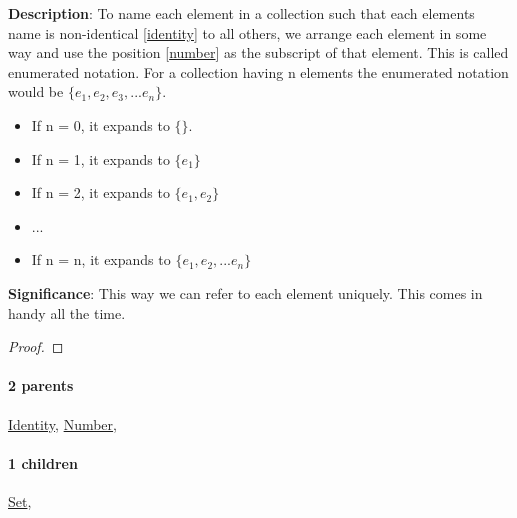 \documentclass[../main.tex]{subfiles}
\begin{document}
\begin{statement}
\label{statement:Enumerated Notation}\hspace*{0pt}\par
\end{statement}
\textbf{Description}:
To name each element in a collection such that each elements name is non-identical [\hyperref[statement:Identity]{identity}] to all others, we arrange each element in some way and use the position [\hyperref[statement:Number]{number}] as the subscript of that element. This is called enumerated notation.
For a collection having n elements the enumerated notation would be $ \{ e_1, e_2, e_3, ... e_n \} $.
\begin{itemize}[noitemsep,topsep=0pt]
  \item If n = 0, it expands to $\{\}$.
  \item If n = 1, it expands to $\{ e_1 \}$
  \item If n = 2, it expands to $\{ e_1, e_2 \}$
  \item ...
  \item If n = n, it expands to $\{ e_1, e_2, ... e_n \}$
\end{itemize}
\par
{\color{magenta} \textbf{Significance}:
This way we can refer to each element uniquely.
This comes in handy all the time.
\par}
\begin{proof}
\proofbydefinition
\end{proof}\par
\paragraph{2 parents} \hyperref[statement:Identity]{Identity}, \hyperref[statement:Number]{Number}, 
\paragraph{1 children} \hyperref[statement:Set]{Set}, 
\end{document}
